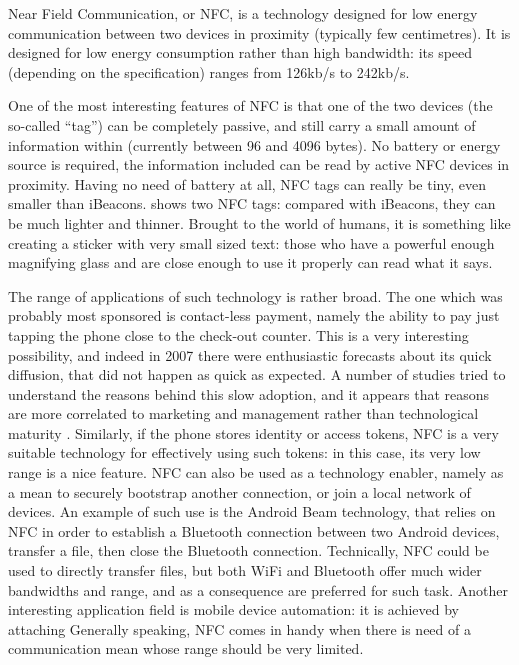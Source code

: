 \documentclass[12pt,a4paper,twoside,openright]{book}
\begin{document}
Near Field Communication, or NFC, is a technology designed for low energy communication between two devices in proximity (typically few centimetres).
%
It is designed for low energy consumption rather than high bandwidth: its speed (depending on the specification) ranges from 126kb/s to 242kb/s.

One of the most interesting features of NFC is that one of the two devices (the so-called ``tag'') can be completely passive, and still carry a small amount of information within (currently between 96 and 4096 bytes).
%
No battery or energy source is required, the information included can be read by active NFC devices in proximity.
%
Having no need of battery at all, NFC tags can really be tiny, even smaller than iBeacons.
%
 shows two NFC tags: compared with iBeacons, they can be much lighter and thinner.
%
Brought to the world of humans, it is something like creating a sticker with very small sized text: those who have a powerful enough magnifying glass and are close enough to use it properly can read what it says.

The range of applications of such technology is rather broad.
%
The one which was probably most sponsored is contact-less payment, namely the ability to pay just tapping the phone close to the check-out counter.
%
This is a very interesting possibility, and indeed in 2007 there were enthusiastic forecasts \cite{nfc2007} about its quick diffusion, that did not happen as quick as expected.
%
A number of studies tried to understand the reasons behind this slow adoption, and it appears that reasons are more correlated to marketing and management rather than technological maturity \cite{nfc-diffusion-reasons, nfc-diffusion-europe, nfc-diffusion-asia}.
%
Similarly, if the phone stores identity or access tokens, NFC is a very suitable technology for effectively using such tokens: in this case, its very low range is a nice feature.
%
NFC can also be used as a technology enabler, namely as a mean to securely bootstrap another connection, or join a local network of devices.
%
An example of such use is the Android Beam technology, that relies on NFC in order to establish a Bluetooth connection between two Android devices, transfer a file, then close the Bluetooth connection.
%
Technically, NFC could be used to directly transfer files, but both WiFi and Bluetooth offer much wider bandwidths and range, and as a consequence are preferred for such task.
%
Another interesting application field is mobile device automation: it is achieved by attaching
%
Generally speaking, NFC comes in handy when there is need of a communication mean whose range should be very limited.
\end{document}
